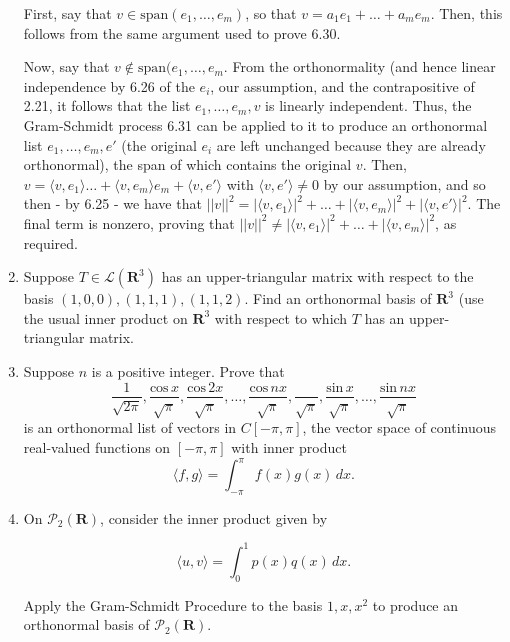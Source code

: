 \documentclass{book}
\begin{document}
\begin{enumerate}
First, say that \(v \in \text{span}(e_1,\dots,e_m)\), so that \(v=a_1e_1+\dots+a_me_m\).  Then, this follows from the same argument used to prove 6.30.

Now, say that \(v \notin \text{span}(e_1,\dots,e_m\).  From the orthonormality (and hence linear independence by 6.26 of the \(e_i\), our assumption, and the contrapositive of 2.21, it follows that the list \(e_1,\dots,e_m, v\) is linearly independent.  Thus, the Gram-Schmidt process 6.31 can be applied to it to produce an orthonormal list \(e_1,\dots,e_m,e'\) (the original \(e_i\) are left unchanged because they are already orthonormal), the span of which contains the original \(v\).  Then, \(v = \langle v, e_1 \rangle \dots + \langle v, e_m \rangle e_m + \langle v, e' \rangle\) with \(\langle v, e' \rangle \neq 0\) by our assumption, and so then - by 6.25 - we have that \(||v||^2=|\langle v,e_1 \rangle |^2 + \dots + |\langle v,e_m \rangle |^2 + |\langle v, e' \rangle|^2\).  The final term is nonzero, proving that \(||v||^2 \neq |\langle v,e_1 \rangle |^2 + \dots + |\langle v,e_m \rangle |^2\), as required.

\item Suppose \(T \in \mathcal{L}(\textbf{R}^3)\) has an upper-triangular matrix with respect to the basis \((1,0,0),(1,1,1),(1,1,2)\).  Find an orthonormal basis of \(\textbf{R}^3\) (use the usual inner product on \(\textbf{R}^3\) with respect to which \(T\) has an upper-triangular matrix.

\item Suppose \(n\) is a positive integer.  Prove that \[\frac{1}{\sqrt{2\pi}},\frac{\textrm{cos} \, x}{\sqrt{\pi}},\frac{\textrm{cos} \, 2x}{\sqrt{\pi}},\dots,\frac{\textrm{cos} \, nx}{\sqrt{\pi}},\frac{}{\sqrt{\pi}},\frac{\textrm{sin} \, x}{\sqrt{\pi}},\dots,\frac{\textrm{sin} \, nx}{\sqrt{\pi}}\] is an orthonormal list of vectors in \(C[-\pi,\pi]\), the vector space of continuous real-valued functions on \([-\pi,\pi]\) with inner product \[\langle f,g \rangle = \int_{-\pi}^{\pi} f(x)g(x) \, dx.\]

\item On \(\mathcal{P}_2(\textbf{R})\), consider the inner product given by

\begin{equation*}
    \langle u,v \rangle = \int_{0}^{1} p(x)q(x) \, dx.
\end{equation*}

Apply the Gram-Schmidt Procedure to the basis \(1,x,x^2\) to produce an orthonormal basis of \(\mathcal{P}_2(\textbf{R})\).


\end{enumerate}
\end{document}
